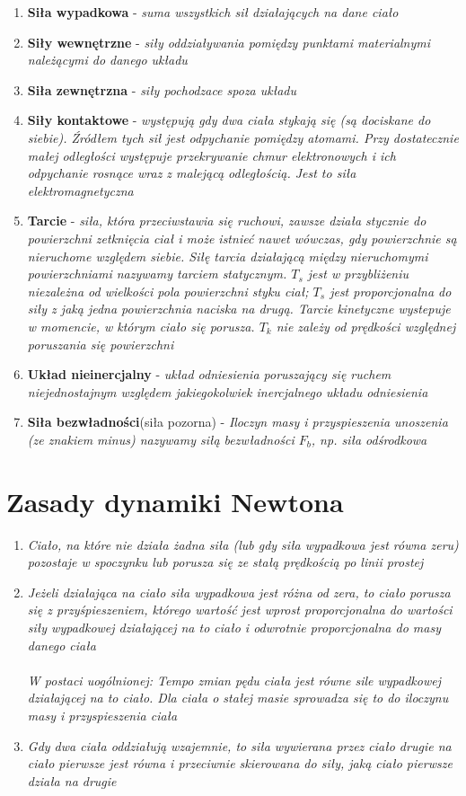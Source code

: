 \documentclass[12pt,twoside,a4paper]{book}
\begin{document}
\begin{enumerate}[label=(\alph*)]
\item\textbf{Siła wypadkowa} - \textit{suma wszystkich sił działających na dane ciało}
\item\textbf{Siły wewnętrzne} - \textit{siły oddziaływania pomiędzy punktami materialnymi należącymi do danego układu}
\item\textbf{Siła zewnętrzna} - \textit{siły pochodzace spoza układu}
\item\textbf{Siły kontaktowe} - \textit{występują gdy dwa ciała stykają się (są dociskane do siebie). Źródłem tych sił jest odpychanie pomiędzy atomami. Przy dostatecznie małej odległości występuje
przekrywanie chmur elektronowych i ich odpychanie rosnące wraz z malejącą odległością.
Jest to siła elektromagnetyczna}
\item\textbf{Tarcie} - \textit{siła, która przeciwstawia się ruchowi, zawsze działa stycznie do powierzchni zetknięcia ciał i może istnieć nawet wówczas, gdy powierzchnie są nieruchome względem siebie. Siłę tarcia działającą między nieruchomymi powierzchniami nazywamy tarciem statycznym. $T_s$ jest w przybliżeniu niezależna od wielkości pola powierzchni styku ciał; $T_s$ jest proporcjonalna do siły z jaką jedna powierzchnia naciska na drugą. Tarcie kinetyczne wystepuje w momencie, w którym ciało się porusza. $T_k$ nie zależy od prędkości względnej poruszania się powierzchni}
\item\textbf{Układ nieinercjalny} - \textit{układ odniesienia poruszający się ruchem niejednostajnym względem jakiegokolwiek inercjalnego układu odniesienia}
\item\textbf{Siła bezwładności}(siła pozorna) - \textit{Iloczyn masy i przyspieszenia unoszenia (ze znakiem minus) nazywamy siłą bezwładności $F_b$, np. siła odśrodkowa}

\end{enumerate}
\section{Zasady dynamiki Newtona}
\begin{enumerate}[label=(\Roman*)]
\item\textit{Ciało, na które nie działa żadna siła (lub gdy siła wypadkowa jest równa zeru)
pozostaje w spoczynku lub porusza się ze stałą prędkością po linii prostej}
\item\textit{Jeżeli działająca na ciało siła wypadkowa jest różna od zera, to ciało porusza się z przyśpieszeniem, którego wartość jest wprost proporcjonalna do wartości siły wypadkowej działającej na to ciało i odwrotnie proporcjonalna do masy danego ciała\\
\\W postaci uogólnionej: Tempo zmian pędu ciała jest równe sile wypadkowej działającej na to ciało. Dla
ciała o stałej masie sprowadza się to do iloczynu masy i przyspieszenia ciała}
\item\textit{Gdy dwa ciała oddziałują wzajemnie, to siła wywierana przez ciało drugie na ciało
pierwsze jest równa i przeciwnie skierowana do siły, jaką ciało pierwsze działa na
drugie}
\end{enumerate}
\end{document}
